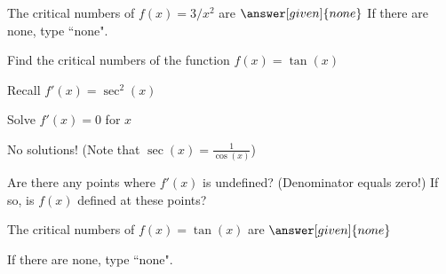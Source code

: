 \documentclass{ximera}
\begin{document}
\begin{description}
\begin{question}
    
		The critical numbers of $f(x) = 3/x^2$ are
		 $\answer[given]{none}$
		If there are none, type ``none".
\end{question}



\begin{question} %
  Find the critical numbers of the function $f(x) = \tan(x)$
  
  
    \begin{hint}
      Recall $f'(x) = \sec^2(x)$
    \end{hint}
		\begin{hint}
      Solve $f'(x) = 0$ for $x$
    \end{hint}
		\begin{hint}
      No solutions! (Note that $\sec(x) = \frac{1}{\cos(x)}$)
    \end{hint}
    \begin{hint}
      Are there any points where $f'(x)$ is undefined? (Denominator equals zero!)
      If so, is $f(x)$ defined at these points?  
		\end{hint}
    
    
		The critical numbers of $f(x) = \tan(x)$ are
		 $\answer[given]{none}$
		
		If there are none, type ``none".
		
\end{question}



\end{description}



\begin{center}
\begin{foldable}
\end{foldable}
\end{center}
\end{document}
